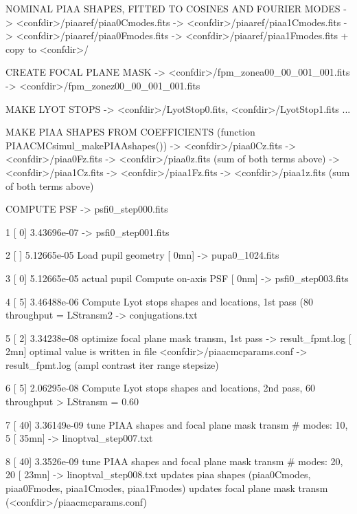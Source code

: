 \begin{DoxyVerb}
{            NOMINAL PIAA SHAPES, FITTED TO COSINES AND FOURIER MODES
            -> <confdir>/piaaref/piaa0Cmodes.fits
            -> <confdir>/piaaref/piaa1Cmodes.fits
            -> <confdir>/piaaref/piaa0Fmodes.fits
            -> <confdir>/piaaref/piaa1Fmodes.fits
            + copy to <confdir>/
        
            CREATE FOCAL PLANE MASK
            -> <confdir>/fpm_zonea00_00_001_001.fits    
            -> <confdir>/fpm_zonez00_00_001_001.fits    

            MAKE LYOT STOPS
            -> <confdir>/LyotStop0.fits, <confdir>/LyotStop1.fits ...
        }
        
        MAKE PIAA SHAPES FROM COEFFICIENTS (function PIAACMCsimul_makePIAAshapes())
        -> <confdir>/piaa0Cz.fits
        -> <confdir>/piaa0Fz.fits
        -> <confdir>/piaa0z.fits (sum of both terms above)
        -> <confdir>/piaa1Cz.fits
        -> <confdir>/piaa1Fz.fits
        -> <confdir>/piaa1z.fits (sum of both terms above)

        COMPUTE PSF
           -> psfi0_step000.fits

  1     [  0]   3.43696e-07
        -> psfi0_step001.fits

  2     [   ]   5.12665e-05 Load pupil geometry                                                     [   0mn]
        -> pupa0_1024.fits

  3     [  0]   5.12665e-05 actual pupil Compute on-axis PSF                                        [   0nm]
        -> psfi0_step003.fits

  4     [  5]   3.46488e-06 Compute Lyot stops shapes and locations, 1st pass (80%
        throughput = LStransm2
        -> conjugations.txt

  5     [  2]   3.34238e-08 optimize focal plane mask transm, 1st pass -> result_fpmt.log           [   2mn]
        optimal value is written in file <confdir>/piaacmcparams.conf
        -> result_fpmt.log (ampl contrast iter range stepsize)

  6     [  5]   2.06295e-08 Compute Lyot stops shapes and locations, 2nd pass, 60%
        throughput > LStransm = 0.60

  7     [ 40]    3.36149e-09    tune PIAA shapes and focal plane mask transm # modes: 10, 5             [  35mn]
        -> linoptval_step007.txt

  8     [ 40]   3.3526e-09  tune PIAA shapes and focal plane mask transm # modes: 20, 20            [  23mn]
        -> linoptval_step008.txt 
        updates piaa shapes (piaa0Cmodes, piaa0Fmodes, piaa1Cmodes, piaa1Fmodes)
        updates focal plane mask transm (<confdir>/piaacmcparams.conf)


\end{DoxyVerb}
